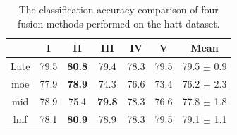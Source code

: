 \documentclass[a4paper, 10pt, twoside]{report}
\begin{document}
\begin{table}[H]
\centering
\caption{The classification accuracy comparison of four fusion methods performed on the \acrshort{hatt} dataset.}
\begin{tabular}{ccccccc}
\toprule
\textbf{}                                                  & \textbf{I}                  & \textbf{II}                                                  & \textbf{III}                                                 & \textbf{IV}                 & \textbf{V}                  & \textbf{Mean}                                  \\ \midrule
\multicolumn{1}{c}{{\color[HTML]{000000} Late}} & {\color[HTML]{000000} 79.5} & \color[HTML]{000000} \textbf{80.8} & {\color[HTML]{000000} 79.4}                                  & {\color[HTML]{000000} 78.3} & {\color[HTML]{000000} 79.5} & {\color[HTML]{000000} 79.5 $\pm$ 0.9} \\ \midrule
\multicolumn{1}{c}{{\color[HTML]{000000} \acrshort{moe}}}  & {\color[HTML]{000000} 77.9} & \color[HTML]{000000} \textbf{78.9} & {\color[HTML]{000000} 74.3}                                  & {\color[HTML]{000000} 76.6} & {\color[HTML]{000000} 73.4} & {\color[HTML]{000000} 76.2 $\pm$ 2.3} \\ \midrule
\multicolumn{1}{c}{{\color[HTML]{000000} \acrshort{mid}}}  & {\color[HTML]{000000} 78.9} & {\color[HTML]{000000} 75.4}                                  & \color[HTML]{000000} \textbf{79.8} & {\color[HTML]{000000} 78.3} & {\color[HTML]{000000} 76.6} & {\color[HTML]{000000} 77.8 $\pm$ 1.8} \\ \midrule
\multicolumn{1}{c}{{\color[HTML]{000000} \acrshort{lmf}}}  & {\color[HTML]{000000} 78.1} & \color[HTML]{000000} \textbf{80.9} & {\color[HTML]{000000} 78.9}                                  & {\color[HTML]{000000} 78.3} & {\color[HTML]{000000} 79.5} & {\color[HTML]{000000} 79.1 $\pm$ 1.1} \\ \bottomrule
\end{tabular}
\label{tab:hatt_results}
\end{table}
\end{document}
